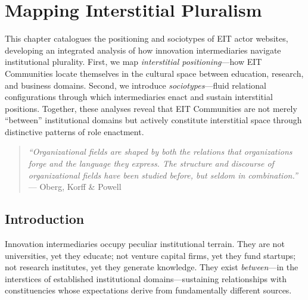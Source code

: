 \documentclass[../main.tex]{subfiles}
\begin{document}
\chapter{Mapping Interstitial Pluralism}
\margintoc

\begin{chapteroverview}
This chapter catalogues the positioning and sociotypes of EIT actor websites, developing an integrated analysis of how innovation intermediaries navigate institutional plurality. First, we map \textit{interstitial positioning}---how EIT Communities locate themselves in the cultural space between education, research, and business domains. Second, we introduce \textit{sociotypes}---fluid relational configurations through which intermediaries enact and sustain interstitial positions. Together, these analyses reveal that EIT Communities are not merely ``between'' institutional domains but actively constitute interstitial space through distinctive patterns of role enactment.
\end{chapteroverview}

\begin{quote}
\textit{``Organizational fields are shaped by both the relations that organizations forge and the language they express. The structure and discourse of organizational fields have been studied before, but seldom in combination.''}\\
--- Oberg, Korff \& Powell \citeyear{oberg2017culture}
\end{quote}


\section{Introduction}

Innovation intermediaries occupy peculiar institutional terrain. They are not universities, yet they educate; not venture capital firms, yet they fund startups; not research institutes, yet they generate knowledge. They exist \textit{between}---in the interstices of established institutional domains---sustaining relationships with constituencies whose expectations derive from fundamentally different sources.
\end{document}
